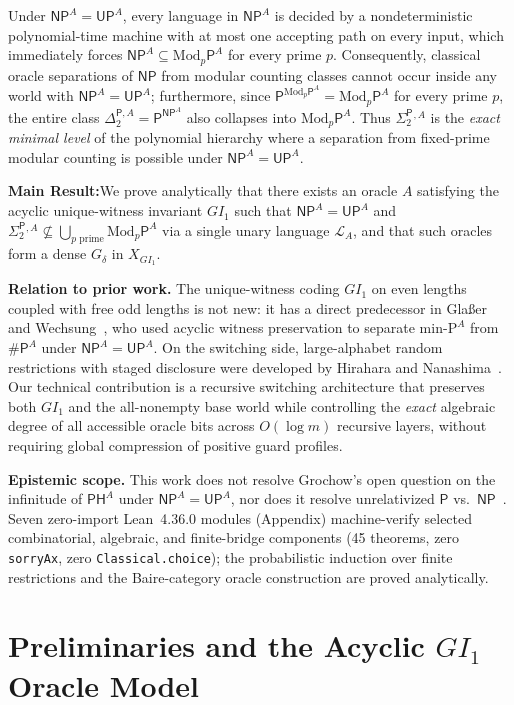\documentclass[11pt,a4paper]{article}
\theoremstyle{definition}
\theoremstyle{remark}
\newcommand{\Pcl}{\mathsf{P}}
\newcommand{\NP}{\mathsf{NP}}
\newcommand{\UP}{\mathsf{UP}}
\newcommand{\PH}{\mathsf{PH}}
\newcommand{\Modp}{\mathrm{Mod}_p\mathsf{P}}
\newcommand{\SharpP}{\#\mathsf{P}}
\newcommand{\SigTwo}{\Sigma_2^{\mathsf{P}}}
\newcommand{\GI}{GI_1}
\newcommand{\takeaway}[2]{%
  \vspace{4pt}\noindent\colorbox{primary!7}{%
    \parbox{\dimexpr\linewidth-2\fboxsep\relax}{%
      \vspace{3pt}\textbf{\color{primary}#1:}\hspace{0.4em}#2\vspace{3pt}%
    }%
  }\vspace{4pt}%
}
\begin{document}
Under $\NP^A = \UP^A$, every language in $\NP^A$ is decided by a nondeterministic polynomial-time machine with at most one accepting path on every input, which immediately forces $\NP^A \subseteq \Modp^A$ for every prime $p$. Consequently, classical oracle separations of $\NP$ from modular counting classes cannot occur inside any world with $\NP^A = \UP^A$; furthermore, since $\Pcl^{\Modp^A} = \Modp^A$ for every prime $p$, the entire class $\Delta_2^{\Pcl,A} = \Pcl^{\NP^A}$ also collapses into $\Modp^A$. Thus $\SigTwo{}^{,A}$ is the \emph{exact minimal level} of the polynomial hierarchy where a separation from fixed-prime modular counting is possible under $\NP^A = \UP^A$.

\takeaway{Main Result}{We prove analytically that there exists an oracle $A$ satisfying the acyclic unique-witness invariant $\GI$ such that $\NP^A = \UP^A$ and $\SigTwo{}^{,A} \not\subseteq \bigcup_{p\text{ prime}} \Modp^A$ via a single unary language $\mathcal{L}_A$, and that such oracles form a dense $G_\delta$ in $X_{\GI}$.}

\textbf{Relation to prior work.} The unique-witness coding $\GI$ on even lengths coupled with free odd lengths is not new: it has a direct predecessor in Gla\ss er and Wechsung~\cite{GlasserWechsung2003}, who used acyclic witness preservation to separate $\mathrm{min\text{-}P}^A$ from $\SharpP^A$ under $\NP^A = \UP^A$. On the switching side, large-alphabet random restrictions with staged disclosure were developed by Hirahara and Nanashima~\cite{HiraharaNanashima2021}. Our technical contribution is a recursive switching architecture that preserves both $\GI$ and the all-nonempty base world while controlling the \emph{exact} algebraic degree of all accessible oracle bits across $O(\log m)$ recursive layers, without requiring global compression of positive guard profiles.

\textbf{Epistemic scope.} This work does not resolve Grochow's open question on the infinitude of $\PH^A$ under $\NP^A = \UP^A$, nor does it resolve unrelativized $\Pcl$ vs.\ $\NP$~\cite{Cook2000,RazborovRudich1997}. Seven zero-import Lean~4.36.0 modules (Appendix) machine-verify selected combinatorial, algebraic, and finite-bridge components (45 theorems, zero \texttt{sorryAx}, zero \texttt{Classical.choice}); the probabilistic induction over finite restrictions and the Baire-category oracle construction are proved analytically.

\section{Preliminaries and the Acyclic $\GI$ Oracle Model}
\end{document}
